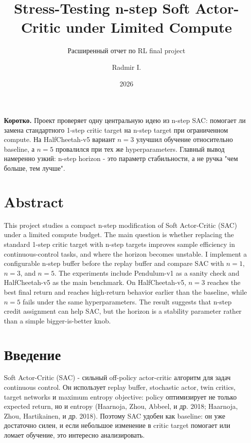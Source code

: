 \documentclass[
  russian,
]{article}
\title{Stress-Testing n-step Soft Actor-Critic under Limited Compute}
\subtitle{Расширенный отчет по RL final project}
\author{Radmir I.}
\date{2026}
\begin{document}
\maketitle

{
\setcounter{tocdepth}{3}
\tableofcontents
}
\begin{keybox}
\textbf{Коротко.} Проект проверяет одну центральную идею из n-step SAC: помогает ли замена стандартного 1-step critic target на n-step target при ограниченном compute. На HalfCheetah-v5 вариант $n=3$ улучшил обучение относительно baseline, а $n=5$ провалился при тех же hyperparameters. Главный вывод намеренно узкий: n-step horizon - это параметр стабильности, а не ручка "чем больше, тем лучше".
\end{keybox}

\section{Abstract}\label{abstract}

This project studies a compact n-step modification of Soft Actor-Critic
(SAC) under a limited compute budget. The main question is whether
replacing the standard 1-step critic target with n-step targets improves
sample efficiency in continuous-control tasks, and where the horizon
becomes unstable. I implement a configurable n-step buffer before the
replay buffer and compare SAC with \(n=1\), \(n=3\), and \(n=5\). The
experiments include Pendulum-v1 as a sanity check and HalfCheetah-v5 as
the main benchmark. On HalfCheetah-v5, \(n=3\) reaches the best final
return and reaches high-return behavior earlier than the baseline, while
\(n=5\) fails under the same hyperparameters. The result suggests that
n-step credit assignment can help SAC, but the horizon is a stability
parameter rather than a simple bigger-is-better knob.

\section{Введение}\label{ux432ux432ux435ux434ux435ux43dux438ux435}

Soft Actor-Critic (SAC) - сильный off-policy actor-critic алгоритм для
задач continuous control. Он использует replay buffer, stochastic actor,
twin critics, target networks и maximum entropy objective: policy
оптимизирует не только expected return, но и entropy (Haarnoja, Zhou,
Abbeel, и др. 2018; Haarnoja, Zhou, Hartikainen, и др. 2018). Поэтому
SAC удобен как baseline: он уже достаточно силен, и если небольшое
изменение в critic target помогает или ломает обучение, это интересно
анализировать.
\end{document}
